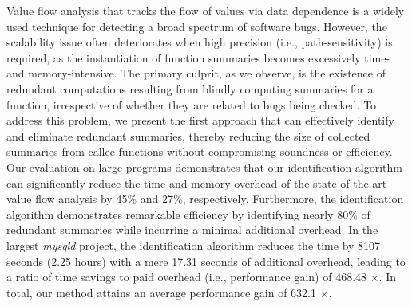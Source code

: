 Value flow analysis that tracks the flow of values via data dependence is a widely used technique for detecting a broad spectrum of software bugs.
However, the scalability issue often deteriorates when high precision (i.e., path-sensitivity) is required, as the instantiation of function summaries becomes excessively time- and memory-intensive.
The primary culprit, as we observe, is the existence of redundant computations resulting from blindly computing summaries for a function, irrespective of whether they are related to bugs being checked.
To address this problem, we present the first approach that can effectively identify and eliminate redundant summaries, thereby reducing the size of collected summaries from callee functions without compromising soundness or efficiency.
Our evaluation on large programs demonstrates that our identification algorithm can significantly reduce the time and memory overhead of the state-of-the-art value flow analysis by 45\% and 27\%, respectively. 
Furthermore, the identification algorithm demonstrates remarkable efficiency by identifying nearly 80\% of redundant summaries while incurring a minimal additional overhead.
In the largest \textit{mysqld} project, the identification algorithm reduces the time by 8107 seconds (2.25 hours) with a mere 17.31 seconds of additional overhead, leading to a ratio of time savings to paid overhead (i.e., performance gain) of 468.48 $\times$. 
In total, our method attains an average performance gain of 632.1 $\times$.